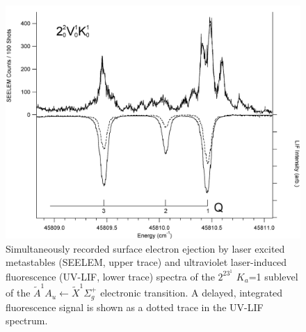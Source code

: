 \documentclass[12pt]{mitthesis}
\begin{document}
\begin{figure}
  \caption{
    Simultaneously recorded surface electron ejection by laser excited
    metastables (SEELEM, upper trace) and ultraviolet laser-induced
    fluorescence (UV-LIF, lower trace) spectra of the $2^23^1$ $K_a$=1
    sublevel of the $\tilde{A}^1A_u \leftarrow \tilde{X} ^1\Sigma_g^+$
    electronic transition. A delayed, integrated fluorescence signal
    is shown as a dotted trace in the UV-LIF spectrum.}
  \label{fig:spectrum-2231-q123}
  \centering
  \includegraphics[width=6in]{spectrum-2231-Q123.png}
\end{figure}
\end{document}
